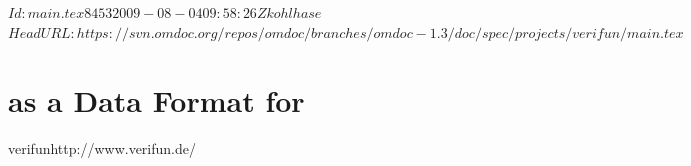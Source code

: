 \svnInfo $Id: main.tex 8453 2009-08-04 09:58:26Z kohlhase $
\svnKeyword $HeadURL: https://svn.omdoc.org/repos/omdoc/branches/omdoc-1.3/doc/spec/projects/verifun/main.tex $

\section[VeriFun]{{\omdoc} as a Data Format for {\verifun}}

\begin{project}{verifun}{http://www.verifun.de/}
\end{project}

